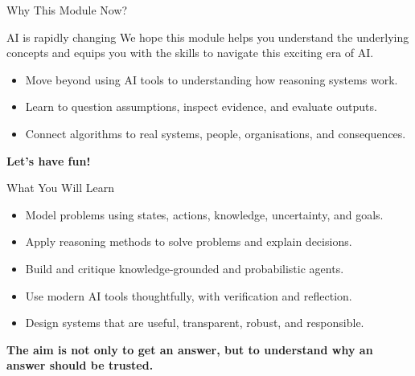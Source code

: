 \documentclass[aspectratio=169]{beamer}
\begin{document}
\begin{frame}{Why This Module Now?}
\begin{block}{AI is rapidly changing}
We hope this module helps you understand the underlying concepts and equips you with the skills to navigate this exciting era of AI.
\end{block}

\begin{itemize}
  \item Move beyond using AI tools to understanding how reasoning systems work.
  \item Learn to question assumptions, inspect evidence, and evaluate outputs.
  \item Connect algorithms to real systems, people, organisations, and consequences.
\end{itemize}

\begin{center}
\Large\textbf{Let’s have fun!}
\end{center}
\end{frame}

\begin{frame}{What You Will Learn}
\begin{itemize}
  \item Model problems using states, actions, knowledge, uncertainty, and goals.
  \item Apply reasoning methods to solve problems and explain decisions.
  \item Build and critique knowledge-grounded and probabilistic agents.
  \item Use modern AI tools thoughtfully, with verification and reflection.
  \item Design systems that are useful, transparent, robust, and responsible.
\end{itemize}

\vspace{0.25cm}
\begin{center}
\textbf{The aim is not only to get an answer, but to understand why an answer should be trusted.}
\end{center}
\end{frame}
\end{document}

